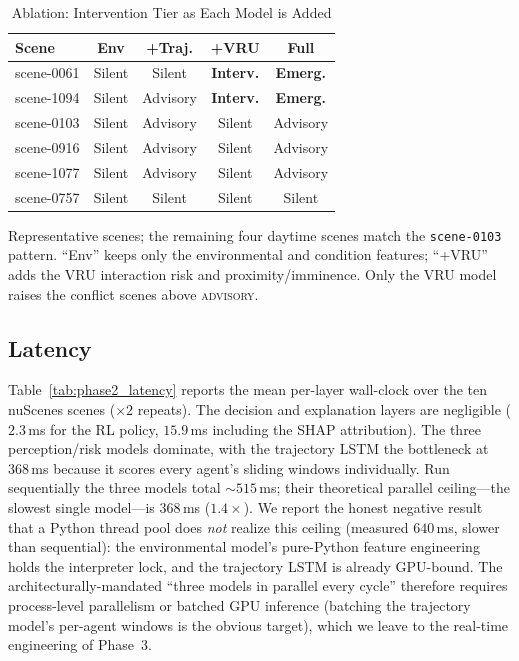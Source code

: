\begin{table}[htbp]
\caption{Ablation: Intervention Tier as Each Model is Added}
\label{tab:phase2_ablation}
\centering
\begin{tabular}{lcccc}
\toprule
\textbf{Scene} & \textbf{Env} & \textbf{+Traj.} & \textbf{+VRU} & \textbf{Full} \\
\midrule
scene-0061 & Silent & Silent   & \textbf{Interv.} & \textbf{Emerg.} \\
scene-1094 & Silent & Advisory & \textbf{Interv.} & \textbf{Emerg.} \\
scene-0103 & Silent & Advisory & Silent   & Advisory \\
scene-0916 & Silent & Advisory & Silent   & Advisory \\
scene-1077 & Silent & Advisory & Silent   & Advisory \\
scene-0757 & Silent & Silent   & Silent   & Silent \\
\bottomrule
\end{tabular}
\vspace{2pt}
\footnotesize{Representative scenes; the remaining four daytime scenes match the
\texttt{scene-0103} pattern. ``Env'' keeps only the environmental and condition
features; ``+VRU'' adds the VRU interaction risk and proximity/imminence. Only
the VRU model raises the conflict scenes above \textsc{advisory}.}
\end{table}

\subsection{Latency}
Table~\ref{tab:phase2_latency} reports the mean per-layer wall-clock over the ten
nuScenes scenes ($\times2$ repeats). The decision and explanation layers are
negligible ($2.3$\,ms for the RL policy, $15.9$\,ms including the SHAP
attribution). The three perception/risk models dominate, with the trajectory
LSTM the bottleneck at $368$\,ms because it scores every agent's sliding windows
individually. Run sequentially the three models total $\sim\!515$\,ms; their
theoretical parallel ceiling---the slowest single model---is $368$\,ms
($1.4\times$). We report the honest negative result that a Python thread pool does
\emph{not} realize this ceiling (measured $640$\,ms, slower than sequential): the
environmental model's pure-Python feature engineering holds the interpreter lock,
and the trajectory LSTM is already GPU-bound. The architecturally-mandated
``three models in parallel every cycle'' therefore requires process-level
parallelism or batched GPU inference (batching the trajectory model's per-agent
windows is the obvious target), which we leave to the real-time engineering of
Phase~3.

